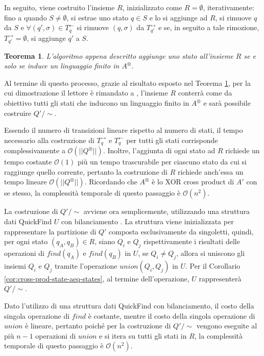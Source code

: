 \documentclass[a4paper,12pt]{report} %
\newcommand{\partitioned}[2]{#1\slash\!\!#2}  %
\newcommand{\bigo}[0]{\mathcal{O}}            %
\newtheorem{theorem}{Teorema}[chapter]        %
\begin{document}
In seguito, viene costruito l'insieme $R$, inizializzato come $R = \emptyset$, iterativamente: fino a quando
$S \neq \emptyset$, si estrae uno stato $q \in S$ e lo si aggiunge ad $R$, si rimuove $q$ da $S$ e 
$\forall (q', \sigma) \in T_q^\leftarrow$ si rimuove $(q, \sigma)$ da $T_{q'}^\rightarrow$ e se, in seguito
a tale rimozione, $T_{q'}^\rightarrow = \emptyset$, si aggiunge $q'$ a $S$.

\begin{theorem}\label{th:rfs-correctness}
  L'algoritmo appena descritto aggiunge uno stato all'insieme $R$ se e solo se induce un linguaggio finito in $A^\otimes$.
\end{theorem}

Al termine di questo processo, grazie al risultato esposto nel Teorema \ref{th:rfs-correctness}, per la cui dimostrazione
il lettore è rimandato a \parencite{Badr}, l'insieme $R$ conterrà come da obiettivo tutti gli stati che inducono
un linguaggio finito in $A^\otimes$ e sarà possibile costruire $\partitioned{Q'}{\sim}$.

Essendo il numero di transizioni lineare rispetto al numero di stati, il tempo necessario alla costruzione 
di $T^\rightarrow_q$ e $T^\leftarrow_q$ per tutti gli stati corrisponde complessivamente a $\bigo(||Q^\otimes||)$.
Inoltre, l'aggiunta di ogni stato ad $R$ richiede un tempo costante $\bigo(1)$ più un tempo trascurabile per ciascuno
stato da cui si raggiunge quello corrente, pertanto la costruzione di $R$ richiede anch'essa un tempo
lineare $\bigo(||Q^\otimes||)$. Ricordando che $A^\otimes$ è lo XOR cross product di $A'$ con se stesso, la complessità
temporale di questo passaggio è $\bigo(n^2)$.

La costruzione di $\partitioned{Q'}{\sim}$ avviene ora semplicemente, utilizzando una struttura dati QuickFind $U$ con 
bilanciamento \parencite{DFI08}. La struttura viene inizializzata per rappresentare la partizione
di $Q'$ composta esclusivamente da singoletti, quindi, per ogni stato $(q_A, q_B) \in R$, siano $Q_i$ e $Q_j$
rispettivamente i risultati delle operazioni di $find(q_A)$ e $find(q_B)$ in $U$, se $Q_i \neq Q_j$, 
allora si uniscono gli insiemi $Q_i$ e $Q_j$ tramite l'operazione $union(Q_i, Q_j)$ in $U$. Per il 
Corollario \ref{cor:cross-prod-state-aeq-states}, al termine dell'operazione, $U$ rappresenterà $\partitioned{Q'}{\sim}$.

Dato l'utilizzo di una struttura dati QuickFind con bilanciamento, il costo della singola operazione di $find$
è costante, mentre il costo della singola operazione di $union$ è lineare, pertanto
poiché per la costruzione di $\partitioned{Q'}{\sim}$ vengono eseguite al più $n - 1$ operazioni di $union$ e si
itera su tutti gli stati in $R$, la complessità temporale di questo passaggio è $\bigo(n^2)$.
\end{document}
